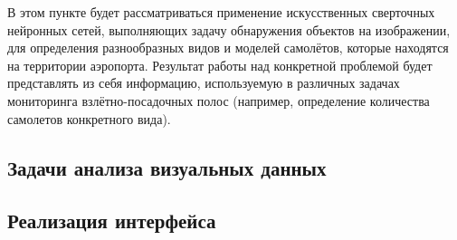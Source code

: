 \documentclass[bachelor, och, coursework]{SCWorks}
\begin{document}
        В этом пункте будет рассматриваться применение искусственных сверточных нейронных сетей, выполняющих задачу обнаружения объектов на изображении, для определения разнообразных видов и моделей самолётов, которые находятся на территории аэропорта. Результат работы над конкретной проблемой будет представлять из себя информацию, используемую в различных задачах мониторинга взлётно-посадочных полос (например, определение количества самолетов конкретного вида).

    \subsection{Задачи анализа визуальных данных}
            
    \subsection{Реализация интерфейса}

\conclusion
\end{document}
